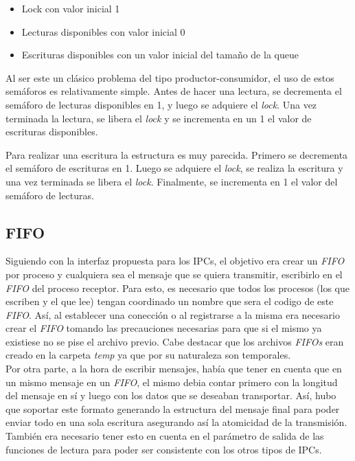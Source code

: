 \documentclass[a4paper,10pt]{article}
\begin{document}
\begin{itemize}
\item Lock con valor inicial 1
\item Lecturas disponibles con valor inicial 0
\item Escrituras disponibles con un valor inicial del tamaño de la queue
\end{itemize}

Al ser este un clásico problema del tipo productor-consumidor, el uso de estos semáforos es relativamente simple.
Antes de hacer una lectura, se decrementa el semáforo de lecturas disponibles en 1, y luego se adquiere el \textit{lock}.
Una vez terminada la lectura, se libera el \textit{lock} y se incrementa en un 1 el valor de escrituras disponibles.

Para realizar una escritura la estructura es muy parecida.
Primero se decrementa el semáforo de escrituras en 1.
Luego se adquiere el \textit{lock}, se realiza la escritura y una vez terminada se libera el \textit{lock}.
Finalmente, se incrementa en 1 el valor del semáforo de lecturas.

\subsection{FIFO}
Siguiendo con la interfaz propuesta para los IPCs, el objetivo era crear un \textit{FIFO} por proceso y cualquiera sea el
mensaje que se quiera transmitir, escribirlo en el \textit{FIFO} del proceso receptor. Para esto, es necesario que todos los
procesos (los que escriben y el que lee) tengan coordinado un nombre que sera el codigo de este \textit{FIFO}. Así,
al establecer una conección o al registrarse a la misma era necesario crear el \textit{FIFO} tomando las precauciones necesarias
para que si el mismo ya existiese no se pise el archivo previo. Cabe destacar que los archivos \textit{FIFOs} eran creado en
la carpeta \textit{temp} ya que por su naturaleza son temporales. \\

Por otra parte, a la hora de escribir mensajes, había que tener en cuenta que en un mismo mensaje en un \textit{FIFO}, el mismo
debia contar primero con la longitud del mensaje en sí y luego con los datos que se deseaban transportar. Así, hubo
que soportar este formato generando la estructura del mensaje final para poder enviar todo en una sola escritura
asegurando así la atomicidad de la transmisión. También era necesario tener esto en cuenta en el parámetro de salida 
de las funciones de lectura para poder ser consistente con los otros tipos de IPCs.
\end{document}
